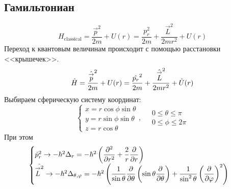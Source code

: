 \subsection{Гамильтониан}
$$
    H_{\mathrm{classical}} = \dfrac{\vec p^2}{2m} + U(r) = \dfrac{p_{r}^2}{2m} + \dfrac{\vec L^2}{2mr^2} + U(r)
$$
Переход к квантовым величинам происходит с помощью расстановки <<крышечек>>.
$$
    \Hat H = \dfrac{\Hat{\vec p}^2}{2m} + U(r) = \dfrac{\Hat{p_{r}}^2}{2m} + \dfrac{\Hat{\vec L}^2}{2mr^2} + \Hat U(r)
$$
Выбираем сферическую систему координат:
$$
    \begin{cases}
        x = r \cos \phi \sin \theta\\
        y = r \sin \phi \sin \theta\\
        z = r \cos \theta
    \end{cases},
    \quad 
    \begin{array}{c}
        0 \leqslant \theta \leqslant \pi\\
        0 \leqslant \phi \leqslant 2 \pi
    \end{array}
$$
При этом
$$
\begin{cases}
    \Hat p_{r}^2 \to - \hbar^2 \Dta_r = - \hbar^2 \left( 
        \dfrac{\partial^2}{\partial r^2} + \dfrac{2}{r} \ud{}{r}
    \right)\\
    \Hat{\vec L^2} \to -\hbar^2 \Dta_{\theta, \phi}
    =
    -\hbar^2 \left(
        \dfrac{1}{\sin \theta} \ud{}{\theta} \left(
            \sin\theta \ud{}{\theta}
        \right)
        + \dfrac{1}{\sin^2 \theta} \left(\ud{}{\phi}\right)^2
    \right)
\end{cases}
$$
